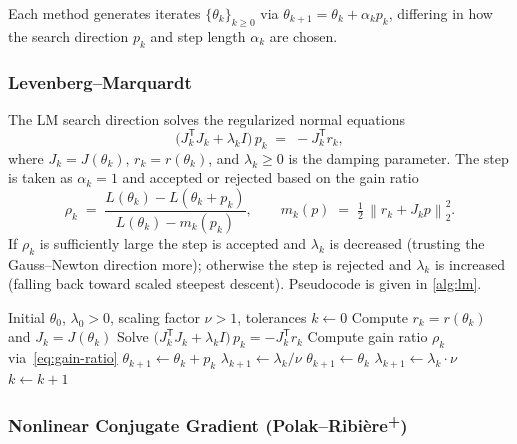 \documentclass[11pt,letterpaper]{article}
\newcommand{\norm}[1]{\left\|#1\right\|}
\newcommand{\T}{^{\mathsf{T}}}
\newcommand{\grad}{\nabla}
\theoremstyle{definition}
\begin{document}
Each method generates iterates $\{\theta_k\}_{k \geq 0}$ via
$\theta_{k+1} = \theta_k + \alpha_k p_k$, differing in how the search
direction $p_k$ and step length $\alpha_k$ are chosen.
 
\subsubsection{Levenberg--Marquardt}
\label{sec:lm}
 
The LM search direction solves the regularized normal equations
\begin{equation}
\bigl(J_k\T J_k + \lambda_k I\bigr)\, p_k
\;=\; -J_k\T r_k,
\label{eq:lm-step}
\end{equation}
where $J_k = J(\theta_k)$, $r_k = r(\theta_k)$, and $\lambda_k \geq 0$ is
the damping parameter. The step is taken as $\alpha_k = 1$ and accepted
or rejected based on the gain ratio
\begin{equation}
\rho_k
\;=\;
\frac{L(\theta_k) - L(\theta_k + p_k)}{L(\theta_k) - m_k(p_k)},
\qquad
m_k(p) \;=\; \tfrac{1}{2}\,\norm{r_k + J_k p}_2^{2}.
\label{eq:gain-ratio}
\end{equation}
If $\rho_k$ is sufficiently large the step is accepted and $\lambda_k$ is
decreased (trusting the Gauss--Newton direction more); otherwise the step
is rejected and $\lambda_k$ is increased (falling back toward scaled
steepest descent). Pseudocode is given in
\cref{alg:lm}.
 
\begin{algorithm}[H]
\caption{Levenberg--Marquardt for nonlinear least squares}
\label{alg:lm}
\begin{algorithmic}[1]
\Require Initial $\theta_0$, $\lambda_0 > 0$, scaling factor $\nu > 1$,
  tolerances
\State $k \gets 0$
\Repeat
  \State Compute $r_k = r(\theta_k)$ and $J_k = J(\theta_k)$
  \State Solve $\bigl(J_k\T J_k + \lambda_k I\bigr)\, p_k = -J_k\T r_k$
  \State Compute gain ratio $\rho_k$ via~\cref{eq:gain-ratio}
    \State $\theta_{k+1} \gets \theta_k + p_k$
    \State $\lambda_{k+1} \gets \lambda_k / \nu$
  \Else
    \State $\theta_{k+1} \gets \theta_k$
    \State $\lambda_{k+1} \gets \lambda_k \cdot \nu$
  \EndIf
  \State $k \gets k+1$
\Until{$\norm{\grad L(\theta_k)}_\infty < \varepsilon$ or $k \geq k_{\max}$}
\end{algorithmic}
\end{algorithm}
 
\subsubsection{Nonlinear Conjugate Gradient (Polak--Ribière\textsuperscript{+})}
\label{sec:ncg}
 
\end{document}
